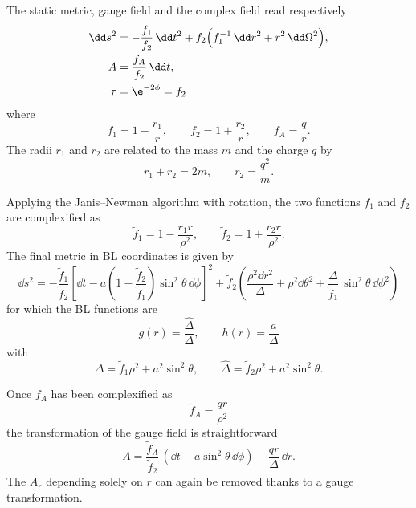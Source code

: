 The static metric, gauge field and the complex field read respectively
\begin{subequations}
\begin{align}
	\dd s^2 &= - \frac{f_1}{f_2}\, \dd t^2 + f_2 \Big(f_1^{-1}\, \dd r^2 + r^2\, \dd\Omega^2 \Big), \\
	A &= \frac{f_A}{f_2}\, \dd t, \\
	\tau &= \e^{-2\phi} = f_2
\end{align}
\end{subequations}
where
\begin{equation}
	f_1 = 1 - \frac{r_1}{r}, \qquad
	f_2 = 1 + \frac{r_2}{r}, \qquad
	f_A = \frac{q}{r}.
\end{equation} 
The radii $r_1$ and $r_2$ are related to the mass $m$ and the charge $q$ by
\begin{equation}
	r_1 + r_2 = 2 m, \qquad
	r_2 = \frac{q^2}{m}.
\end{equation} 

Applying the Janis--Newman algorithm with rotation, the two functions $f_1$ and $f_2$ are complexified as
\begin{equation}
	\tilde f_1 = 1 - \frac{r_1 r}{\rho^2}, \qquad
	\tilde f_2 = 1 + \frac{r_2 r}{\rho^2}.
\end{equation} 
The final metric in BL coordinates is given by
\begin{equation}
	\dd s^2 = - \frac{\tilde f_1}{\tilde f_2} \left[ \dd t - a \left(1 - \frac{\tilde f_2}{\tilde f_1}\right) \sin^2 \theta\, \dd\phi \right]^2
		+ \tilde f_2 \left( \frac{\rho^2 \dd r^2}{\Delta} + \rho^2 \dd\theta^2 + \frac{\Delta}{\tilde f_1}\, \sin^2 \theta\, \dd\phi^2 \right)
\end{equation}
for which the BL functions are
\begin{equation}
	g(r) = \frac{\hat \Delta}{\Delta}, \qquad
	h(r) = \frac{a}{\Delta}
\end{equation} 
with
\begin{equation}
	\label{matter:eq:sen-bh-delta}
	\Delta = \tilde f_1 \rho^2 + a^2 \sin^2 \theta, \qquad
	\hat \Delta = \tilde f_2 \rho^2 + a^2 \sin^2 \theta.
\end{equation} 

Once $f_A$ has been complexified as
\begin{equation}
	\tilde f_A = \frac{q r}{\rho^2}
\end{equation} 
the transformation of the gauge field is straightforward
\begin{equation}
	A = \frac{\tilde f_A}{\tilde f_2}\, (\dd t - a \sin^2 \theta\, \dd\phi )
		- \frac{q r}{\Delta}\, \dd r.
\end{equation} 
The $A_r$ depending solely on $r$ can again be removed thanks to a gauge transformation.

